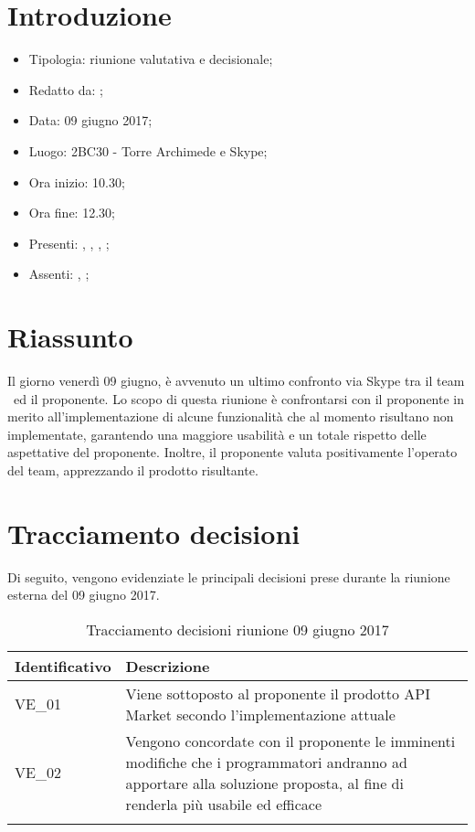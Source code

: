 \section{Introduzione}

	\begin{itemize}
		\item Tipologia: riunione valutativa e decisionale;
		\item Redatto da: \MC;
		\item Data: 09 giugno 2017;
		\item Luogo: 2BC30 - Torre Archimede e Skype;
		\item Ora inizio: 10.30;
		\item Ora fine: 12.30;
		\item Presenti: \AN, \MC, \AS, \NS;	
		\item Assenti: \DAN, \DS;
	\end{itemize}

\section{Riassunto}
Il giorno venerdì 09 giugno, è avvenuto un ultimo confronto via Skype tra il team \gruppo\ ed il proponente.
Lo scopo di questa riunione è confrontarsi con il proponente in merito all'implementazione di alcune funzionalità che al momento risultano non implementate, garantendo una maggiore usabilità e un totale rispetto delle aspettative del proponente.
Inoltre, il proponente valuta positivamente l'operato del team, apprezzando il prodotto risultante.\\

\section{Tracciamento decisioni}
Di seguito, vengono evidenziate le principali decisioni prese durante la riunione esterna del 09 giugno 2017.

\begin{longtable}{|>{\centering\arraybackslash}p{4cm}|>{\centering\arraybackslash}p{9cm}|}
	\hline \rowcolor{Gray}
	\textbf{Identificativo} & \textbf{Descrizione}\\
	\hline
	\endhead
			VE\_01	& Viene sottoposto al proponente il prodotto API Market secondo l'implementazione attuale \\
			\hline
			VE\_02 & Vengono concordate con il proponente le imminenti modifiche che i programmatori andranno ad apportare alla soluzione proposta, al fine di renderla più usabile ed efficace \\
			\hline
		\caption{Tracciamento decisioni riunione 09 giugno 2017}
\end{longtable}
